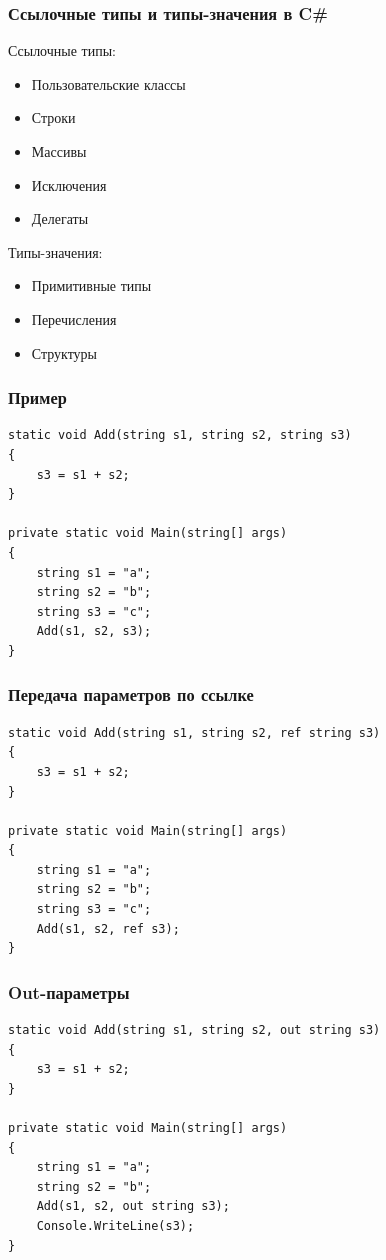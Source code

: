 \documentclass[xetex,mathserif,serif]{beamer}
\begin{document}
    \begin{frame}
        \frametitle{Ссылочные типы и типы-значения в C\#}
        Ссылочные типы:
        \begin{itemize}
            \item Пользовательские классы
            \item Строки
            \item Массивы
            \item Исключения
            \item Делегаты
        \end{itemize}

        Типы-значения:
        \begin{itemize}
            \item Примитивные типы
            \item Перечисления
            \item Структуры
        \end{itemize}
    \end{frame}
    
        \begin{frame}[fragile]
        \frametitle{Пример}
        \begin{verbatim}
static void Add(string s1, string s2, string s3)
{
    s3 = s1 + s2;
}

private static void Main(string[] args)
{
    string s1 = "a";
    string s2 = "b";
    string s3 = "c";
    Add(s1, s2, s3);
}
        \end{verbatim}
    \end{frame}

    \begin{frame}[fragile]
        \frametitle{Передача параметров по ссылке}
        \begin{verbatim}
static void Add(string s1, string s2, ref string s3)
{
    s3 = s1 + s2;
}

private static void Main(string[] args)
{
    string s1 = "a";
    string s2 = "b";
    string s3 = "c";
    Add(s1, s2, ref s3);
}
        \end{verbatim}
    \end{frame}

    \begin{frame}[fragile]
        \frametitle{Out-параметры}
        \begin{verbatim}
static void Add(string s1, string s2, out string s3)
{
    s3 = s1 + s2;
}

private static void Main(string[] args)
{
    string s1 = "a";
    string s2 = "b";
    Add(s1, s2, out string s3);
    Console.WriteLine(s3);
}
        \end{verbatim}
    \end{frame}
\end{document}
